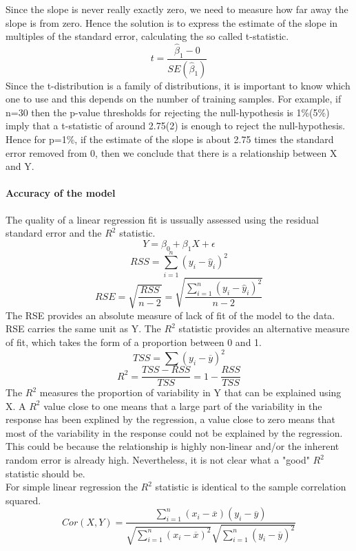 \documentclass[../document.tex]{subfiles}
\begin{document}
	Since the slope is never really exactly zero, we need to measure how far away the slope is from zero. Hence the solution is to express the estimate of the slope in multiples of the standard error, calculating the so called t-statistic.
	\begin{equation}
		t = \frac{\hat{\beta}_{1}-0}{SE(\hat{\beta}_{1})}
	\end{equation}
	Since the t-distribution is a family of distributions, it is important to know which one to use and this depends on the number of training samples.
	For example, if n=30 then the p-value thresholds for rejecting the null-hypothesis is 1\%(5\%) imply that a t-statistic of around 2.75(2) is enough to reject the null-hypothesis.\\
	Hence for p=1\%, if the estimate of the slope is about 2.75 times the standard error removed from 0, then we conclude that there is a relationship between X and Y.
	
	\paragraph{Accuracy of the model}
	The quality of a linear regression fit is ussually assessed using the residual standard error and the \(R^2\) statistic.
	\begin{equation}
		Y = \beta_{0} + \beta_{1}X + \epsilon
	\end{equation}
	\begin{equation}
		RSS = \sum_{i=1}^{n}(y_{i}-\hat{y}_{i})^2
	\end{equation}
	\begin{equation}
		RSE = \sqrt{\frac{RSS}{n-2}} = \sqrt{\frac{\sum_{i=1}^{n}(y_{i}-\hat{y}_{i})^2}{n-2}}
	\end{equation}
	The RSE provides an absolute measure of lack of fit of the model to the data. RSE carries the same unit as Y. The \(R^2\) statistic provides an alternative measure of fit, which takes the form of a proportion between 0 and 1.
	\begin{equation}
		TSS = \sum(y_{i}-\overline{y})^2
	\end{equation}
	\begin{equation}
		R^2 = \frac{TSS - RSS}{TSS} = 1-\frac{RSS}{TSS}
	\end{equation}
	The \(R^2\) measures the proportion of variability in Y that can be explained using X. A \(R^2\) value close to one means that a large part of the variability in the response has been explined by the regression, a value close to zero means that most of the variability in the response could not be explained by the regression. This could be because the relationship is highly non-linear and/or the inherent random error is already high. Nevertheless, it is not clear what a "good" \(R^2\) statistic should be.\\
	For simple linear regression the \(R^2\) statistic is identical to the sample correlation squared.
	\begin{equation}
		Cor(X,Y)=\frac{\sum_{i=1}^{n}(x_{i}-\overline{x})(y_{i}-\overline{y})}{\sqrt{\sum_{i=1}^{n}(x_{i}-\overline{x})^2}\sqrt{\sum_{i=1}^{n}(y_{i}-\overline{y})^2}}
	\end{equation} 
\end{document}
